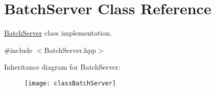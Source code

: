 \hypertarget{classBatchServer}{
\section{BatchServer Class Reference}
\label{classBatchServer}
}


\hyperlink{classBatchServer}{BatchServer} class implementation.  




{\ttfamily \#include $<$BatchServer.hpp$>$}

Inheritance diagram for BatchServer:\begin{figure}[H]
\begin{center}
\leavevmode
\texttt{[image: classBatchServer]}
\end{center}
\end{figure}
